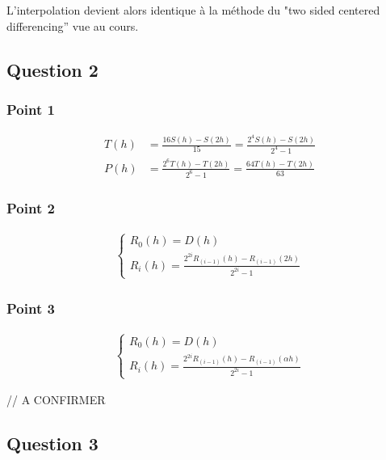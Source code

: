 L'interpolation devient alors identique à la méthode du "two sided centered differencing'' vue au cours.

\subsection{Question 2}

\subsubsection{Point 1}

\begin{equation}
	\begin{aligned}
		T(h) &= \frac{16S(h)-S(2h)}{15} = \frac{2^4S(h)-S(2h)}{2^4-1}\\
		P(h) &= \frac{2^6T(h)-T(2h)}{2^6-1} = \frac{64T(h)-T(2h)}{63}
	\end{aligned}
\end{equation}

\subsubsection{Point 2}

\begin{equation}
	\begin{aligned}
		\begin{cases} 
			R_0(h) = D(h)\\
			R_i(h) = \frac{2^{2i}R_{(i-1)}(h) - R_{(i-1)}(2h)}{2^{2i}-1}
		\end{cases}
	\end{aligned}
\end{equation}

\subsubsection{Point 3}

\begin{equation}
	\begin{aligned}
		\begin{cases} 
			R_0(h) = D(h)\\
			R_i(h) = \frac{2^{2i}R_{(i-1)}(h) - R_{(i-1)}(\alpha h)}{2^{2i}-1}
		\end{cases}
	\end{aligned}
\end{equation}

// A CONFIRMER

\subsection{Question 3}

